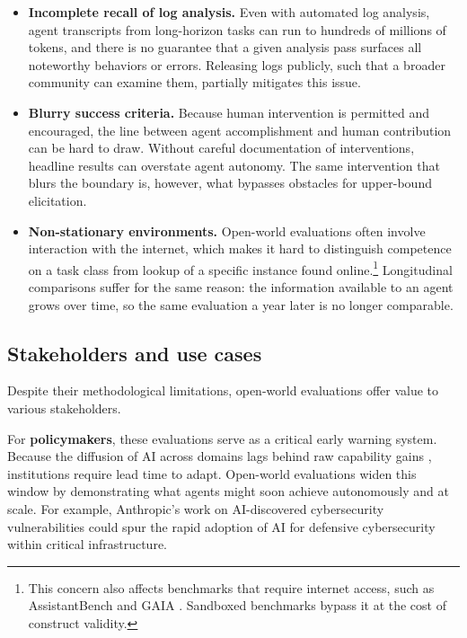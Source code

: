 \documentclass{article}
\begin{document}
\begin{itemize}[leftmargin=9pt, topsep=-3pt, itemsep=3pt, parsep=0pt]
\item \textbf{Incomplete recall of log analysis.} Even with automated log analysis, agent transcripts from long-horizon tasks can run to hundreds of millions of tokens, and there is no guarantee that a given analysis pass surfaces all noteworthy behaviors or errors. Releasing logs publicly, such that a broader community can examine them, partially mitigates this issue.
\item \textbf{Blurry success criteria.} Because human intervention is permitted and encouraged, the line between agent accomplishment and human contribution can be hard to draw. Without careful documentation of interventions, headline results can overstate agent autonomy. The same intervention that blurs the boundary is, however, what bypasses obstacles for upper-bound elicitation.
\item \textbf{Non-stationary environments.} Open-world evaluations often involve interaction with the internet, which makes it hard to distinguish competence on a task class from lookup of a specific instance found online.\footnote{This concern also affects benchmarks that require internet access, such as AssistantBench \citep{arxivabs240715711} and GAIA \citep{arxivabs231112983}. Sandboxed benchmarks bypass it at the cost of construct validity.} Longitudinal comparisons suffer for the same reason: the information available to an agent grows over time, so the same evaluation a year later is no longer comparable.
\end{itemize}

\vspace{0pt}
\subsection{Stakeholders and use cases}\label{how-different-stakeholders-can-use-open-world-evaluations}

Despite their methodological limitations, open-world evaluations offer value to various stakeholders.

For \textbf{policymakers}, these evaluations serve as a critical early warning system. Because the diffusion of AI across domains lags behind raw capability gains \citep{normaltechAiPAi}, institutions require lead time to adapt. Open-world evaluations widen this window by demonstrating what agents might soon achieve autonomously and at scale. For example, Anthropic's work on AI-discovered cybersecurity vulnerabilities \citep{anthropicComNewsClaude,anthropicComGlasswing} could spur the rapid adoption of AI for defensive cybersecurity within critical infrastructure.
\end{document}
